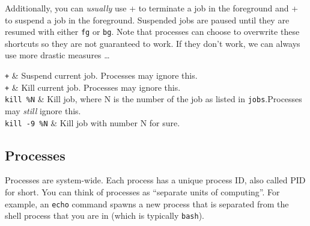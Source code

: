 \documentclass{TheAlternativeCourse}
\begin{document}
Additionally, you can \emph{usually} use \keys{\ctrl}+ to terminate a
job in the foreground and \keys{\ctrl}+ to suspend a job in the
foreground. Suspended jobs are paused until they are resumed with either
\texttt{fg} or \texttt{bg}. Note that processes can choose to overwrite these
shortcuts so they are not guaranteed to work. If they don't work, we can always
use more drastic measures \ldots

\begin{table}[H]
    \centering
    \begin{tcolorbox}[%
        enhanced,
        fuzzy shadow={1mm}{-1mm}{0mm}{0.1mm}{black!50!white},
        width=1.0\linewidth,
        tabularx={>{\centering\arraybackslash}l|>{\centering\arraybackslash}X},
        title={Controlling jobs}]
		\texttt{\keys{\ctrl}+} & Suspend current job. Processes may ignore this.\\
		\texttt{\keys{\ctrl}+} & Kill current job. Processes may ignore this.\\
	    \texttt{kill \%N} & Kill job, where N is the number of the job as
        listed in \texttt{jobs}.Processes may \emph{still} ignore this.\\
	    \texttt{kill -9 \%N} & Kill job with number N for sure.\\
    \end{tcolorbox}
    \label{tab8}
\end{table}

\subsection{Processes}

Processes are system-wide. Each process has a unique process ID, also called
PID for short. You can think of processes as ``separate units of computing''. For
example, an \texttt{echo} command spawns a new process that is separated from
the shell process that you are in (which is typically \texttt{bash}).
\end{document}
